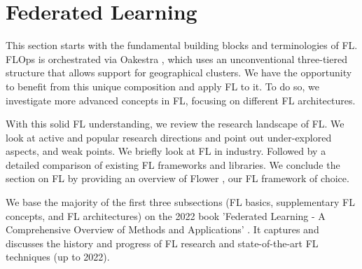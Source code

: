 \section{Federated Learning}\label{section:federated_learning}

This section starts with the fundamental building blocks and terminologies of FL.
FLOps is orchestrated via Oakestra \cite{paper:oakestra_usenix}, which uses an unconventional
three-tiered structure that allows support for geographical clusters.
We have the opportunity to benefit from this unique composition and apply FL to it.
To do so, we investigate more advanced concepts in FL, focusing on different FL architectures.

With this solid FL understanding, we review the research landscape of FL.
We look at active and popular research directions and point out under-explored aspects,
and weak points.
We briefly look at FL in industry.
Followed by a detailed comparison of existing FL frameworks and libraries.
We conclude the section on FL by providing an overview of Flower \cite{flower_docs}, our FL framework of choice.

We base the majority of the first three subsections
(FL basics, supplementary FL concepts, and FL architectures) on the 2022 book
'Federated Learning - A Comprehensive Overview of Methods and Applications' \cite{book:fl}.
It captures and discusses the history and progress of FL research and state-of-the-art FL techniques (up to 2022).







